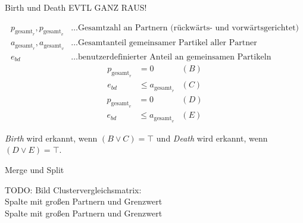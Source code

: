 \documentclass[10pt]{beamer}
\newcommand{\wichtig}[1]{\textit{#1}}
\begin{document}
\begin{frame}{Birth und Death}
	EVTL GANZ RAUS!
	
	\begin{align*}
	p_{\text{gesamt}_r}, p_{\text{gesamt}_v} &\ldots \text{Gesamtzahl an Partnern (rückwärts- und vorwärtsgerichtet)}\\
	a_{\text{gesamt}_r}, a_{\text{gesamt}_v} &\ldots \text{Gesamtanteil gemeinsamer Partikel aller Partner}\\
	e_{bd} &\ldots \text{benutzerdefinierter Anteil an gemeinsamen Partikeln}
	\end{align*}
	\begin{equation}
	\begin{aligned}\label{eq:birth}
		p_{\text{gesamt}_r} &= 0 &(B)\\
		e_{bd} &\le a_{\text{gesamt}_r} &(C)
	\end{aligned}
	\end{equation}
	\begin{equation}
	\begin{aligned}\label{eq:death}
		p_{\text{gesamt}_v} &= 0 &(D)\\
		e_{bd} &\le a_{\text{gesamt}_v} &(E)
	\end{aligned}
	\end{equation}
	
	\wichtig{Birth} wird erkannt, wenn $(B \lor C) = \top$ und \wichtig{Death} wird erkannt, wenn $(D \lor E) = \top$.
\end{frame}

\begin{frame}{Merge und Split}
	
	TODO: Bild Clustervergleichsmatrix:\\
	Spalte mit großen Partnern und Grenzwert\\
	Spalte mit großen Partnern und Grenzwert
	
\end{frame}
\end{document}
